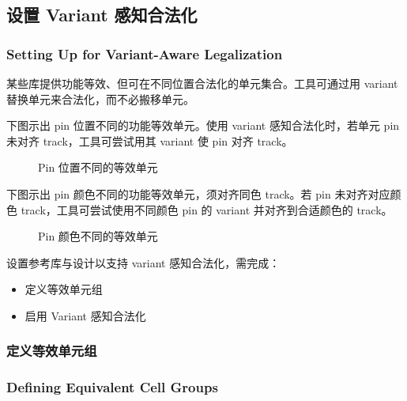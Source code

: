 \subsection{设置 Variant 感知合法化}
\subsubsection*{Setting Up for Variant-Aware Legalization}

某些库提供功能等效、但可在不同位置合法化的单元集合。工具可通过用 variant 替换单元来合法化，而不必搬移单元。

下图示出 pin 位置不同的功能等效单元。使用 variant 感知合法化时，若单元 pin 未对齐 track，工具可尝试用其 variant 使 pin 对齐 track。

\begin{figure}[htbp]
\centering
{}
\caption{Pin 位置不同的等效单元}
\label{fig:ch2b-equiv-pin-loc}
\end{figure}

下图示出 pin 颜色不同的功能等效单元，须对齐同色 track。若 pin 未对齐对应颜色 track，工具可尝试使用不同颜色 pin 的 variant 并对齐到合适颜色的 track。

\begin{figure}[htbp]
\centering
{}
\caption{Pin 颜色不同的等效单元}
\label{fig:ch2b-equiv-pin-color}
\end{figure}

设置参考库与设计以支持 variant 感知合法化，需完成：
\begin{itemize}
  \item 定义等效单元组
  \item 启用 Variant 感知合法化
\end{itemize}

\subsubsection{定义等效单元组}
\subsubsection*{Defining Equivalent Cell Groups}

